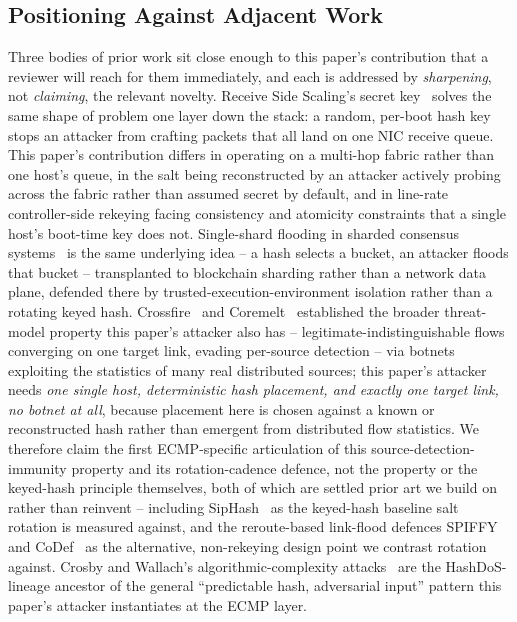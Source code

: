 \documentclass[conference]{IEEEtran}
\begin{document}
\subsection{Positioning Against Adjacent Work}

Three bodies of prior work sit close enough to this paper's contribution that a reviewer will reach for them
immediately, and each is addressed by \emph{sharpening}, not \emph{claiming}, the relevant novelty. Receive Side
Scaling's secret key~\cite{rsskey} solves the same shape of problem one layer down the stack: a random,
per-boot hash key stops an attacker from crafting packets that all land on one NIC receive queue. This paper's
contribution differs in operating on a multi-hop fabric rather than one host's queue, in the salt being
reconstructed by an attacker actively probing across the fabric rather than assumed secret by default, and in
line-rate controller-side rekeying facing consistency and atomicity constraints that a single host's boot-time
key does not. Single-shard flooding in sharded consensus systems~\cite{singleshard} is the same underlying
idea -- a hash selects a bucket, an attacker floods that bucket -- transplanted to blockchain sharding rather
than a network data plane, defended there by trusted-execution-environment isolation rather than a rotating
keyed hash. Crossfire~\cite{crossfire} and Coremelt~\cite{coremelt} established the broader threat-model property
this paper's attacker also has -- legitimate-indistinguishable flows converging on one target link, evading
per-source detection -- via botnets exploiting the statistics of many real distributed sources; this paper's
attacker needs \emph{one single host, deterministic hash placement, and exactly one target link, no botnet at
all}, because placement here is chosen against a known or reconstructed hash rather than emergent from
distributed flow statistics. We therefore claim the first ECMP-specific articulation of this
source-detection-immunity property and its rotation-cadence defence, not the property or the keyed-hash principle
themselves, both of which are settled prior art we build on rather than reinvent -- including
SipHash~\cite{siphash} as the keyed-hash baseline salt rotation is measured against, and the reroute-based
link-flood defences SPIFFY~\cite{spiffy} and CoDef~\cite{codef} as the alternative, non-rekeying design point we
contrast rotation against. Crosby and Wallach's algorithmic-complexity attacks~\cite{crosbywallach} are the
HashDoS-lineage ancestor of the general ``predictable hash, adversarial input'' pattern this paper's attacker
instantiates at the ECMP layer.
\end{document}
